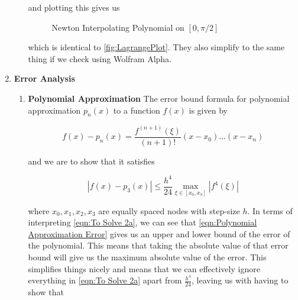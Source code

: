 \documentclass[12pt]{article}
\begin{document}
\begin{enumerate}
\begin{enumerate}
            and plotting this gives us 

            \begin{figure}[H]
                \begin{center}
                   \scalebox{.7}{}
                   \caption{Newton Interpolating Polynomial on $[0, \pi/2]$}
                   \label{fig:NewtonPlot}
                \end{center}
            \end{figure}
            \noindent
            which is identical to \autoref{fig:LagrangePlot}. They also simplify to the same thing if we check using 
            Wolfram Alpha. 
            
        \end{enumerate}

        \item \textbf{Error Analysis} \newline
        \begin{enumerate}
            \item \textbf{Polynomial Approximation}
            The error bound formula for polynomial approximation $p_n(x)$ to a function $f(x)$ is given by

            \begin{equation}
                f(x)-p_n(x) = \frac{f^{(n+1)}(\xi)}{(n+1)!}(x-x_0)\dots(x-x_n)
                \label{eqn:Polynomial Approximation Error}
            \end{equation}

            and we are to show that it satisfies

            \begin{equation}
                |f(x)-p_3(x)| \leq \frac{h^4}{24} \max_{\xi \in [x_0, x_3]} |f^4(\xi)|
                \label{eqn:To Solve 2a}
            \end{equation}
            
            where $x_0, x_1, x_2, x_3$ are equally spaced nodes with step-size $h$. In terms of interpreting 
            \autoref{eqn:To Solve 2a}, we can see that \autoref{eqn:Polynomial Approximation Error} gives us an 
            upper and lower bound of the error of the polynomial. This means that taking the absolute value of 
            that error bound will give us the maximum absolute value of the error. This simplifies things nicely 
            and means that we can effectively ignore everything in \autoref{eqn:To Solve 2a} apart from $\frac{h^4}{24}$, 
            leaving us with having to show that 


\end{enumerate}
\end{enumerate}
\end{document}
